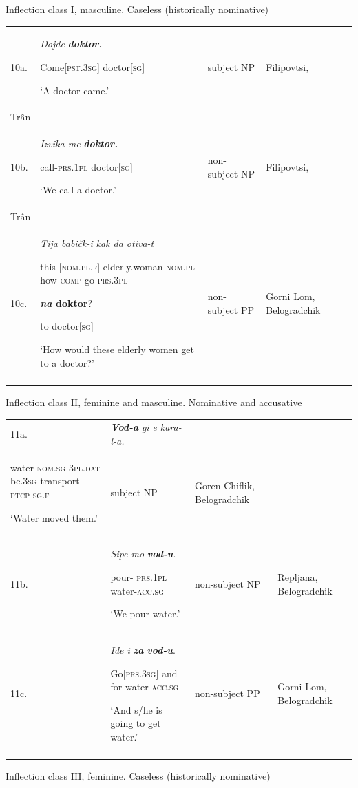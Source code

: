 \documentclass[output=paper]{langscibook}
\begin{document}
Inflection class I, masculine. Caseless (historically nominative)


\begin{tabularx}{\textwidth}{XXXX}

\lsptoprule
10a. & \textit{Dojde}     \textbf{\textit{doktor.}}

Come[\textsc{pst.3sg]}  doctor[\textsc{sg]}

‘A doctor came.’ & subject NP & Filipovtsi,                                                                                                            \\
Trân\\
10b. & \textit{Izvika-me} \textbf{\textit{doktor.}}

call-\textsc{prs.1pl}  doctor[\textsc{sg]}

‘We call a doctor.’ & non-subject NP & Filipovtsi,                                                                                                              \\
Trân\\
10c. & \textit{Tija                    babičk-i}    \textit{kak    da       otiva-t} \textbf{   }

this [\textsc{nom.pl.f}]   elderly.woman-\textsc{nom.pl}     how   \textsc{comp}  go-\textsc{prs.3pl}      

\textbf{\textit{na}    \textbf{doktor}}?

to    doctor[\textsc{sg]}

‘How would these elderly women get to a doctor?’ & non-subject PP & Gorni Lom,                                               Belogradchik\\
\lspbottomrule
\end{tabularx}
Inflection class II, feminine and masculine. Nominative and accusative


\begin{tabularx}{\textwidth}{XXXX}

\lsptoprule
11a. & \textbf{\textit{Vod-a}}    \textit{gi}          \textit{e           kara-l-a.}\\
water-\textsc{nom.sg}  \textsc{3pl.dat}   be.\textsc{3sg}   transport-\textsc{ptcp-sg.f}

‘Water moved them.’ & subject NP & Goren Chiflik,                                               Belogradchik\\
11b. & \textit{Sipe-mo} \textbf{\textit{vod-u}}. 

pour- \textsc{prs.1pl}     water-\textsc{acc.sg}

‘We pour water.’ & non-subject NP & Repljana,                                               Belogradchik\\
11c. & \textit{Ide                  i} \textbf{\textit{za} }  \textbf{\textit{vod-u}}.

Go[\textsc{prs.3sg]}   and      for  water-\textsc{acc.sg}

‘And s/he is going to get water.’ & non-subject PP & Gorni Lom,                                               Belogradchik\\
\lspbottomrule
\end{tabularx}
Inflection class III, feminine. Caseless (historically nominative)
\end{document}
